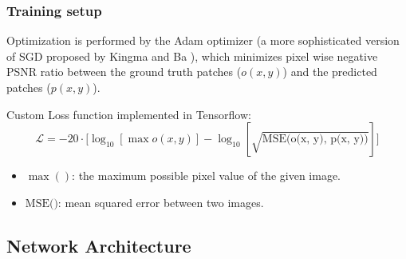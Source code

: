 \documentclass{beamer}
\begin{document}
\begin{frame}
    \frametitle{Training setup}
    Optimization is performed by the Adam optimizer (a more sophisticated version of SGD proposed by Kingma and Ba \cite{kingma2014adam}), which minimizes pixel wise negative PSNR ratio between the ground truth patches ($o(x, y)$) and the predicted patches ($p(x, y)$).
    \vspace{20pt}
    \begin{block}{Custom Loss function implemented in Tensorflow:}
        \begin{equation}\label{eq:loss}
            \mathcal{L} = -20 \cdot \big[ \log_{10}[\max o(x, y)] - \log_{10}[\sqrt{\text{MSE(o(x, y), p(x, y))}}] \big]
        \end{equation}
    \end{block}
    \vspace{20pt}

    \begin{itemize}
        \item $\max()$: the maximum possible pixel value of the given image.
        \item $\text{MSE()}$: mean squared error between two images.
    \end{itemize}
\end{frame}



\subsection{Network Architecture}
\end{document}
